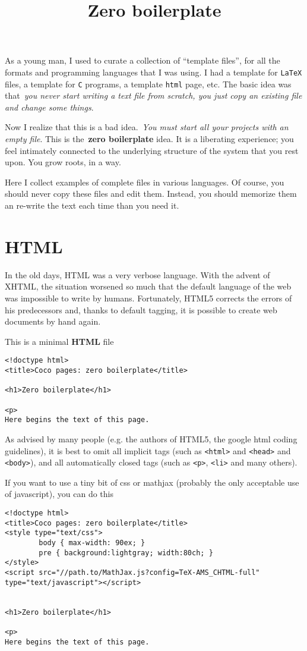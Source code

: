 \title{Zero boilerplate}

As a young man, I used to curate a collection of ``template files'', for all
the formats and programming languages that I was using.  I had a template for
\verb+LaTeX+ files, a template for \verb+C+ programs, a template \verb+html+
page, etc.  The basic idea was that~\emph{you never start writing a text file
from scratch, you just copy an existing file and change some things}.

Now I realize that this is a bad idea.~\emph{You must start all your projects
with an empty file}.  This is the~{\bf zero boilerplate} idea.  It is a
liberating experience; you feel intimately connected to the underlying
structure of the system that you rest upon.  You grow roots, in a way.

Here I collect examples of complete files in various languages.  Of course,
you should never copy these files and edit them.  Instead, you should
memorize them an re-write the text each time than you need it.

\section{HTML}

In the old days, HTML was a very verbose language.  With the advent of XHTML,
the situation worsened so much that the default language of the web was
impossible to write by humans.  Fortunately, HTML5 corrects the errors of his
predecessors and, thanks to default tagging, it is possible to create web
documents by hand again.

This is a minimal {\bf HTML} file
\begin{verbatim}
<!doctype html>
<title>Coco pages: zero boilerplate</title>

<h1>Zero boilerplate</h1>

<p>
Here begins the text of this page.
\end{verbatim}

As advised by many people (e.g. the authors of HTML5, the google html coding
guidelines), it is best to omit all implicit tags (such as \verb+<html>+ and
\verb+<head>+ and \verb+<body>+), and all automatically closed tags (such as
\verb+<p>+, \verb+<li>+ and many others).

If you want to use a tiny bit of css or mathjax (probably the only acceptable
use of javascript), you can do this
\begin{verbatim}
<!doctype html>
<title>Coco pages: zero boilerplate</title>
<style type="text/css">
        body { max-width: 90ex; }
        pre { background:lightgray; width:80ch; }
</style>
<script src="//path.to/MathJax.js?config=TeX-AMS_CHTML-full" type="text/javascript"></script>


<h1>Zero boilerplate</h1>

<p>
Here begins the text of this page.
\end{verbatim}

